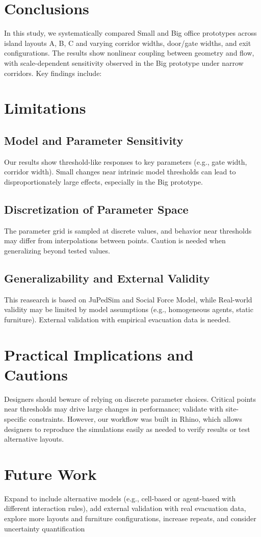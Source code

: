 \section{Conclusions}
In this study, we systematically compared Small and Big office prototypes across island layouts A, B, C and varying corridor widths, door/gate widths, and exit configurations. The results show nonlinear coupling between geometry and flow, with scale-dependent sensitivity observed in the Big prototype under narrow corridors. Key findings include:
\section{Limitations}

\subsection{Model and Parameter Sensitivity}

Our results show threshold-like responses to key parameters (e.g., gate width, corridor width). Small changes near intrinsic model thresholds can lead to disproportionately large effects, especially in the Big prototype.
\subsection{Discretization of Parameter Space}

The parameter grid is sampled at discrete values, and behavior near thresholds may differ from interpolations between points. Caution is needed when generalizing beyond tested values.

\subsection{Generalizability and External Validity}

This reasearch is based on JuPedSim and Social Force Model, while Real-world validity may be limited by model assumptions (e.g., homogeneous agents, static furniture). External validation with empirical evacuation data is needed.
\section{Practical Implications and Cautions}

Designers should beware of relying on discrete parameter choices. Critical points near thresholds may drive large changes in performance; validate with site-specific constraints. However, our workflow was built in Rhino, which allows designers to reproduce the simulations easily as needed to verify results or test alternative layouts.

\section{Future Work}
Expand to include alternative models (e.g., cell-based or agent-based with different interaction rules), add external validation with real evacuation data, explore more layouts and furniture configurations, increase repeats, and consider uncertainty quantification